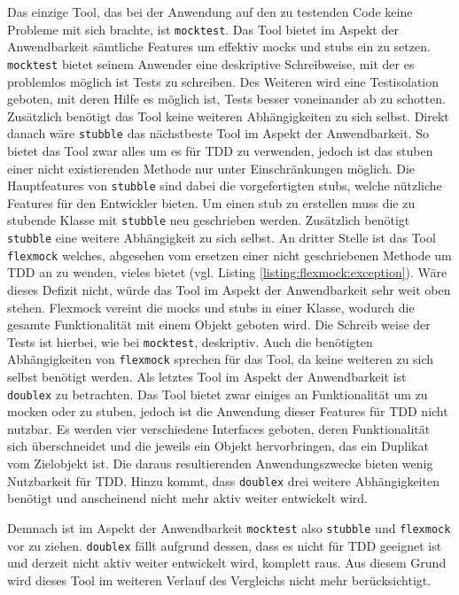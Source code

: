 Das einzige Tool, das bei der Anwendung auf den zu testenden Code keine
Probleme mit sich brachte, ist \lstinline{mocktest}. Das Tool bietet im Aspekt 
der Anwendbarkeit sämtliche Features um effektiv \Glspl{mock} und \Glspl{stub} 
ein zu setzen. \lstinline{mocktest} bietet seinem Anwender eine deskriptive 
Schreibweise, mit der es problemlos möglich ist Tests zu schreiben. Des 
Weiteren wird eine Testisolation geboten, mit deren Hilfe es möglich ist, Tests 
besser voneinander ab zu schotten. Zusätzlich benötigt das Tool keine weiteren
Abhängigkeiten zu sich selbst. Direkt danach wäre \lstinline{stubble} das  
nächstbeste Tool im Aspekt der Anwendbarkeit. So bietet das Tool zwar alles 
um  es für TDD zu verwenden, jedoch ist das \Gls{stub}en einer nicht 
existierenden Methode nur unter Einschränkungen möglich. Die Hauptfeatures von 
\lstinline{stubble} sind dabei die vorgefertigten \Glspl{stub}, welche 
nützliche Features für den Entwickler bieten. Um einen \Gls{stub} zu erstellen 
muss die zu \gls{stub}ende Klasse mit \lstinline{stubble} neu geschrieben 
werden. Zusätzlich benötigt \lstinline{stubble} eine weitere Abhängigkeit zu 
sich selbst. An dritter Stelle ist das Tool \lstinline{flexmock} welches,
abgesehen vom ersetzen einer nicht geschriebenen Methode um TDD an zu 
wenden, vieles bietet (vgl. Listing \ref{listing:flexmock:exception}). Wäre 
dieses Defizit nicht, würde das Tool im Aspekt der Anwendbarkeit sehr weit oben 
stehen. Flexmock vereint die \Glspl{mock} und \Glspl{stub} in einer Klasse, 
wodurch die gesamte Funktionalität mit einem Objekt geboten wird. Die Schreib 
weise der Tests ist hierbei, wie bei \lstinline{mocktest}, deskriptiv. Auch die 
benötigten Abhängigkeiten von \lstinline{flexmock} sprechen für das Tool, da 
keine weiteren zu sich selbst benötigt werden. Als letztes Tool im Aspekt der
Anwendbarkeit ist \lstinline{doublex} zu betrachten. Das Tool bietet zwar
einiges an Funktionalität um zu \gls{mock}en oder zu \gls{stub}en, jedoch ist
die Anwendung dieser Features für TDD nicht nutzbar. Es werden vier
verschiedene Interfaces geboten, deren Funktionalität sich überschneidet und
die jeweils ein Objekt hervorbringen, das ein Duplikat vom Zielobjekt ist.
Die daraus resultierenden Anwendungszwecke bieten wenig Nutzbarkeit für TDD.
Hinzu kommt, dass \lstinline{doublex} drei weitere Abhängigkeiten benötigt und
anscheinend nicht mehr aktiv weiter entwickelt wird.

Demnach ist im Aspekt der Anwendbarkeit \lstinline{mocktest} also
\lstinline{stubble} und \lstinline{flexmock} vor zu ziehen. \lstinline{doublex}
fällt aufgrund dessen, dass es nicht für TDD geeignet ist und derzeit nicht
aktiv weiter entwickelt wird, komplett raus. Aus diesem Grund wird dieses Tool
im weiteren Verlauf des Vergleichs nicht mehr berücksichtigt.
\newline

